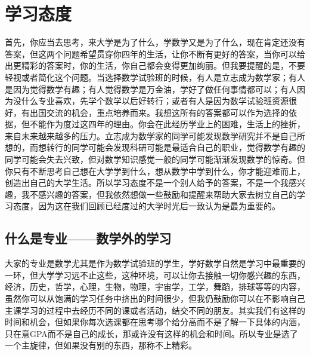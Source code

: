 \section{学习态度}
首先，你应当去思考，来大学是为了什么，学数学又是为了什么，现在肯定还没有答案，但这两个问题希望贯穿你四年的生活，让你不断有更好的答案，当你可以给出更精彩的答案时，你的生活，你自己都会变得更加绚丽。但我要提醒的是，不要轻视或者简化这个问题。当选择数学试验班的时候，有人是立志成为数学家；有人是因为觉得数学有趣；有人觉得数学是万金油，学好了做任何事情都可以；有人因为没什么专业喜欢，先学个数学以后好转行；或者有人是因为数学试验班资源很好，有出国交流的机会，重点培养而来。我想这所有的答案都可以作为选择的依据，但不能作为度过这四年的理由。你会在此经历学业上的困难，生活上的挫折，来自未来越来越多的压力。立志成为数学家的同学可能发现数学研究并不是自己所想的，而想转行的同学可能会发现科研可能是最适合自己的职业，觉得数学有趣的同学可能会失去兴致，但对数学知识感觉一般的同学可能渐渐发现数学的惊奇。但你只有不断思考自己想在大学学到什么，想从数学中学到什么，你才能迎难而上，创造出自己的大学生活。所以学习态度不是一个别人给予的答案，不是一个我感兴趣，我不感兴趣的答案，但我依然想做一些鼓励和提醒来帮助大家去树立自己的学习态度，因为这在我们回顾已经度过的大学时光后一致认为是最为重要的。

\subsection{什么是专业——数学外的学习}
大家的专业是数学尤其是作为数学试验班的学生，学好数学自然是学习中最重要的一环，但大学学习远不止这些，这种环境，可以让你去接触一切你感兴趣的东西，经济，历史，哲学，心理，生物，物理，宇宙学，工学，舞蹈，排球等等的内容，虽然你可以从饱满的学习任务中挤出的时间很少，但我仍鼓励你可以在不影响自己主课学习的过程中去经历不同的课或者活动，结交不同的朋友。其实我们有这样的时间和机会，但如果你每次选课都在思考哪个给分高而不是了解一下具体的内涵，只在意GPA而不是自己的成长，那或许没有这样的机会和时间。所以专业是选了一个主旋律，但如果没有别的东西，那称不上精彩。

